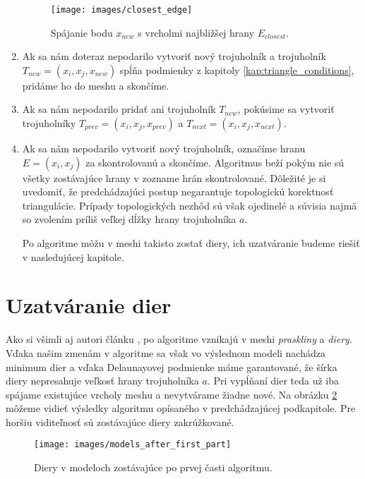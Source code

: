 \begin{enumerate}
{        \begin{figure}
            \centerline{\texttt{[image: images/closest\_edge]}}
            \caption[Spájanie nového bodu s vrcholmi najbližšej hrany]
            {Spájanie bodu $x_{new}$ s vrcholmi najbližšej hrany $E_{closest}$.}
            \label{obr:closest_edge}
        \end{figure}
    }
    \item{
        Ak sa nám doteraz nepodarilo vytvoriť nový trojuholník a trojuholník $T_{new} = (x_i, x_j, x_{new})$
        spĺňa podmienky z kapitoly \ref{kap:triangle_conditions}, pridáme ho do meshu a skončíme.
    }
    \item{
        Ak sa nám nepodarilo pridať ani trojuholník $T_{new}$, pokúsime sa vytvoriť trojuholníky 
        $T_{prev} = (x_i, x_j, x_{prev})$ a $T_{next} = (x_i, x_j, x_{next})$.
    }
    \item{
        Ak sa nám nepodarilo vytvoriť nový trojuholník, označíme hranu $E = (x_i, x_j)$ za skontrolovanú
        a skončíme.
    }
    Algoritmus beží pokým nie sú všetky zostávajúce hrany v zozname hrán skontrolované. 
    Dôležité je si uvedomiť, že predchádzajúci postup negarantuje topologickú korektnosť
    triangulácie. Prípady topologických nezhôd sú však ojedinelé a súvisia najmä so zvolením príliš
    veľkej dĺžky hrany trojuholníka $a$.

    Po algoritme môžu v meshi takisto zostať diery, ich uzatváranie budeme riešiť v nasledujúcej kapitole.
\end{enumerate}

\section{Uzatváranie dier}
\label{kap:second_part_of_algorithm}
Ako si všimli aj autori článku \cite{akkouche2001adaptive}, po algoritme vznikajú v meshi 
\textit{praskliny} a \textit{diery}. Vďaka našim zmenám v algoritme sa však vo výslednom modeli nachádza minimum dier 
a vďaka Delaunayovej podmienke máme garantované, že šírka diery nepresahuje veľkosť hrany trojuholníka
$a$. Pri vypĺňaní dier teda už iba spájame existujúce vrcholy meshu a nevytvárame žiadne nové.
Na obrázku \ref{obr:models_after_first_part} môžeme vidieť výsledky algoritmu opísaného v 
predchádzajúcej podkapitole. Pre horšiu viditeľnosť sú zostávajúce diery zakrúžkované.

\begin{figure}
    \centerline{\texttt{[image: images/models\_after\_first\_part]}}
    \caption[Diery v modeloch]
    {Diery v modeloch zostávajúce po prvej časti algoritmu.}
    \label{obr:models_after_first_part}
\end{figure}

